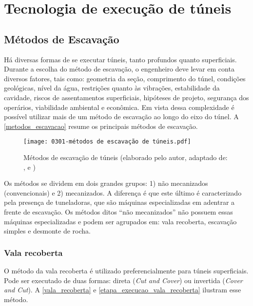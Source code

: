 \chapter{Tecnologia de execução de túneis}

\section{Métodos de Escavação}

Há diversas formas de se executar túneis, tanto profundos quanto superficiais. Durante a escolha do método de escavação, o engenheiro deve levar em conta diversos fatores, tais como: geometria da seção, comprimento do túnel, condições geológicas, nível da água, restrições quanto às vibrações, estabilidade da cavidade, riscos de assentamentos superficiais, hipóteses de projeto, segurança dos operários, viabilidade ambiental e econômica. Em vista dessa complexidade é possível utilizar mais de um método de escavação ao longo do eixo do túnel. A \autoref{metodos_escavacao} resume os principais métodos de escavação.

\begin{figure}[H]
	\begin{center}
		\texttt{[image: 0301-métodos de escavação de túneis.pdf]}
	\end{center}
	\caption{\label{metodos_escavacao}Métodos de escavação de túneis (elaborado pelo autor, adaptado de: ,  e )}
\end{figure}

Os métodos se dividem em dois grandes grupos: 1) não mecanizados (convencionais) e 2) mecanizados. A diferença é que este último é caracterizado pela presença de tuneladoras, que são máquinas especializadas em adentrar a frente de escavação. Os métodos ditos “não mecanizados” não possuem essas máquinas especializadas e podem ser agrupados em: vala recoberta, escavação simples e desmonte de rocha.

\subsection{Vala recoberta}

O método da vala recoberta é utilizado preferencialmente para túneis superficiais. Pode ser executado de duas formas: direta (\textit{Cut and Cover}) ou invertida (\textit{Cover and Cut}). A \autoref{vala_recoberta} e \autoref{etapa_execucao_vala_recoberta} ilustram esse método.

